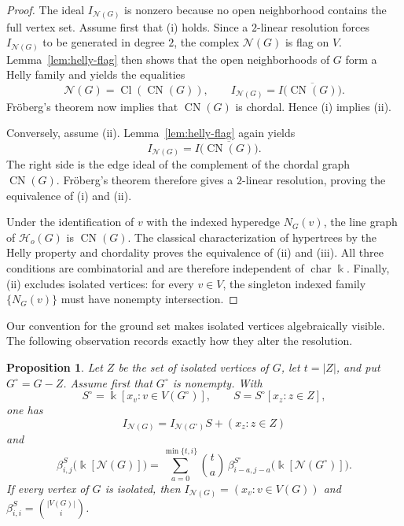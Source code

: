 \documentclass[10pt,a4paper]{amsart}
\newtheorem{proposition}[theorem]{Proposition}
\numberwithin{equation}{section}
\newcommand{\NN}{\mathcal N}
\newcommand{\Ho}{\mathcal H_{\!o}}
\newcommand{\Cl}{\operatorname{Cl}}
\newcommand{\CN}{\operatorname{CN}}
\begin{document}
	\begin{proof}
		The ideal \(I_{\NN(G)}\) is nonzero because no open neighborhood contains the
		full vertex set. Assume first that \textup{(i)} holds. Since a \(2\)-linear
		resolution forces \(I_{\NN(G)}\) to be generated in degree \(2\), the complex
		\(\NN(G)\) is flag on \(V\). Lemma~\ref{lem:helly-flag} then shows that the open neighborhoods of \(G\)
		form a Helly family and yields the equalities
		\[
		\NN(G)=\Cl(\CN(G)),
		\qquad
		I_{\NN(G)}=I\bigl(\overline{\CN(G)}\bigr).
		\]
		Fr\"oberg's theorem \cite[Theorem~1]{Froberg1990} now implies that
		\(\CN(G)\) is chordal. Hence \textup{(i)} implies \textup{(ii)}.
		
		Conversely, assume \textup{(ii)}. Lemma~\ref{lem:helly-flag} again yields
		\[
		I_{\NN(G)}=I\bigl(\overline{\CN(G)}\bigr).
		\]
		The right side is the edge ideal of the complement of the chordal graph
		\(\CN(G)\). Fr\"oberg's theorem therefore gives a \(2\)-linear resolution,
		proving the equivalence of \textup{(i)} and \textup{(ii)}.
		
		Under the identification of \(v\) with the indexed hyperedge \(N_G(v)\), the
		line graph of \(\Ho(G)\) is \(\CN(G)\). The classical characterization of hypertrees by the Helly property
		and chordality \cite{BrandstadtDraganChepoiVoloshin1998} proves the
		equivalence of \textup{(ii)} and \textup{(iii)}. All three conditions are
		combinatorial and are therefore independent of \(\operatorname{char}\Bbbk\).
		Finally, \textup{(ii)} excludes isolated vertices: for every \(v\in V\), the
		singleton indexed family \(\{N_G(v)\}\) must have nonempty intersection.
	\end{proof}

	Our convention for the ground set makes isolated vertices algebraically visible.
	The following observation records exactly how they alter the resolution.

	\begin{proposition}\label{prop:isolated-vertices}
		Let \(Z\) be the set of isolated vertices of \(G\), let \(t=|Z|\), and put
		\(G^{\circ}=G-Z\). Assume first that \(G^{\circ}\) is nonempty. With
		\[
		S^{\circ}=\Bbbk[x_v:v\in V(G^{\circ})],
		\qquad S=S^{\circ}[x_z:z\in Z],
		\]
		one has
		\[
		I_{\NN(G)}=I_{\NN(G^{\circ})}S+(x_z:z\in Z)
		\]
		and
		\begin{equation}\label{eq:isolated-convolution}
		\beta^{S}_{i,j}\bigl(\Bbbk[\NN(G)]\bigr)
		=
		\sum_{a=0}^{\min\{t,i\}}
		\binom ta\,
		\beta^{S^{\circ}}_{i-a,j-a}
		\bigl(\Bbbk[\NN(G^{\circ})]\bigr).
		\end{equation}
		If every vertex of \(G\) is isolated, then
		\(I_{\NN(G)}=(x_v:v\in V(G))\) and
		\(\beta^S_{i,i}=\binom{|V(G)|}{i}\).
	\end{proposition}
\end{document}
